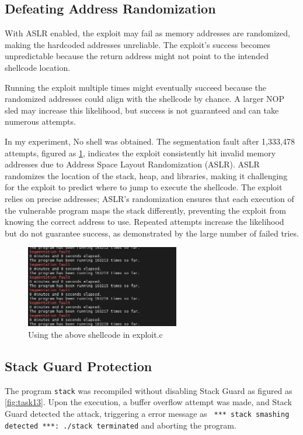 \documentclass[a4paper,11pt]{article}
\begin{document}
\subsection{Defeating Address Randomization}
With ASLR enabled, the exploit may fail as memory addresses are randomized, making the hardcoded addresses unreliable. The exploit's success becomes unpredictable because the return address might not point to the intended shellcode location.

Running the exploit multiple times might eventually succeed because the randomized addresses could align with the shellcode by chance. A larger NOP sled may increase this likelihood, but success is not guaranteed and can take numerous attempts.

In my experiment, No shell was obtained. The segmentation fault after 1,333,478 attempts, figured as \ref{fig:task12}, indicates the exploit consistently hit invalid memory addresses due to Address Space Layout Randomization (ASLR). ASLR randomizes the location of the stack, heap, and libraries, making it challenging for the exploit to predict where to jump to execute the shellcode. The exploit relies on precise addresses; ASLR's randomization ensures that each execution of the vulnerable program maps the stack differently, preventing the exploit from knowing the correct address to use. Repeated attempts increase the likelihood but do not guarantee success, as demonstrated by the large number of failed tries.
\begin{figure}[h]
    \centering
       \includegraphics[width=0.6\textwidth]{figures/task12/task12.png}
    \caption{Using the above shellcode in exploit.c}\label{fig:task12}
\end{figure}

\subsection{Stack Guard Protection}
The program \verb|stack| was recompiled without disabling Stack Guard as figured as \ref{fig:task13}. Upon the execution, a buffer overflow attempt was made, and Stack Guard detected the attack, triggering a error message as \verb| *** stack smashing detected ***: ./stack terminated| and aborting the program. 
\end{document}
